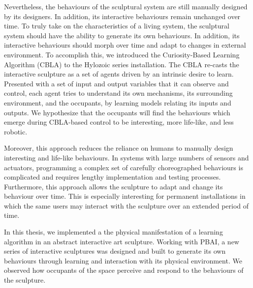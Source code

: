 
Nevertheless, the behaviours of the sculptural system are still manually designed by its designers. In addition, its interactive behaviours remain unchanged over time. To truly take on the characteristics of a living system, the sculptural system should have the ability to generate its own behaviours. In addition, its interactive behaviours should morph over time and adapt to changes in external environment. To accomplish this, we introduced the Curiosity-Based Learning Algorithm (CBLA) to the Hylozoic series installation. The CBLA re-casts the interactive sculpture as a set of agents driven by an intrinsic desire to learn. Presented with a set of input and output variables that it can observe and control, each agent tries to understand its own mechanisms, its surrounding environment, and the occupants, by learning models relating its inputs and outputs. We hypothesize that the occupants will find the behaviours which emerge during CBLA-based control to be interesting, more life-like, and less robotic. 

Moreover, this approach reduces the reliance on humans to manually design interesting and life-like behaviours. In systems with large numbers of sensors and actuators, programming a complex set of carefully choreographed behaviours is complicated and requires lengthy implementation and testing processes. Furthermore, this approach allows the sculpture to adapt and change its behaviour over time. This is especially interesting for permanent installations in which the same users may interact with the sculpture over an extended period of time. 

In this thesis, we implemented a the physical manifestation of a learning algorithm in an abstract interactive art sculpture. Working with PBAI, a new series of interactive sculptures was designed and built to generate its own behaviours through learning and interaction with its physical environment. We observed how occupants of the space perceive and respond to the behaviours of the sculpture. 

